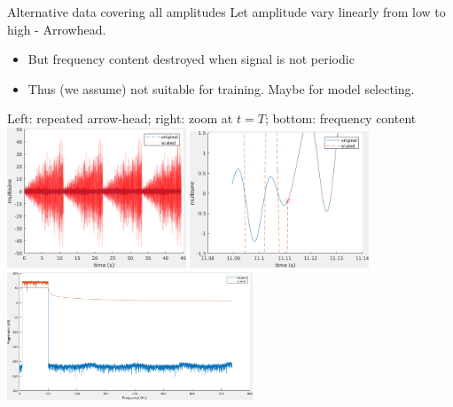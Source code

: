 \documentclass[9pt]{beamer}
\begin{document}
\begin{frame}{Alternative data covering all amplitudes}
  Let amplitude vary linearly from low to high - Arrowhead.
  \begin{itemize}
  \item But frequency content destroyed when signal is not periodic
  \item Thus (we assume) not suitable for training. Maybe for model selecting.
  \end{itemize}
  \begin{center}
    Left: repeated arrow-head; right: zoom at $t=T$; bottom: frequency content\\
    \includegraphics[width=0.4\textwidth]{fig/arrow_full}
    \includegraphics[width=0.4\textwidth]{fig/arrow_zoom}
    \includegraphics[width=0.55\textwidth]{fig/arrow_freq}
  \end{center}
\end{frame}
\end{document}
